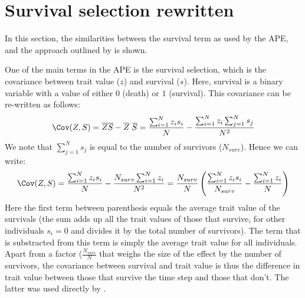 \section{Survival selection rewritten}
\label{app:rebke}
In this section, the similarities between the survival term as used by the APE, and the approach outlined by \citet{Rebke2010} is shown.

One of the main terms in the APE is the survival selection, which is the covariance between trait value ($z$) and survival ($s$). Here, survival is a binary variable with a value of either $0$ (death) or $1$ (survival). This covariance can be re-written as follows:
\begin{equation}
\Cov (Z,S) = \overline{ZS} - \overline{Z} \; \overline{S} =  \frac{\sum_{i=1}^N z_i s_i}{N} - \frac{\sum_{i=1}^N z_i \sum_{j=1}^N s_j}{N^2}
\end{equation}
We note that $\sum_{j=1}^N s_j$ is equal to the number of survivors ($N_{surv}$). Hence we can write:
\begin{equation}
\Cov (Z,S) = \frac{\sum_{i=1}^N z_i s_i}{N} - \frac{N_{surv} \sum_{i=1}^N z_i}{N^2} = \frac{N_{surv}}{N} \left( \frac{\sum_{i=1}^N z_i s_i}{N_{surv}} - \frac{\sum_{i=1}^N z_i}{N} \right)
\end{equation}
Here the first term between parenthesis equals the average trait value of the survivals (the sum adds up all the trait values of those that survive, for other individuals $s_i=0$ and divides it by the total number of survivors). The term that is substracted from this term is simply the average trait value for all individuals. Apart from a factor ($\frac{N_{surv}}{N}$ that weighs the size of the effect by the number of survivors, the covariance between survival and trait value is thus the difference in trait value between those that survive the time step and those that don't. The latter was used directly by \citet{Rebke2010}.
